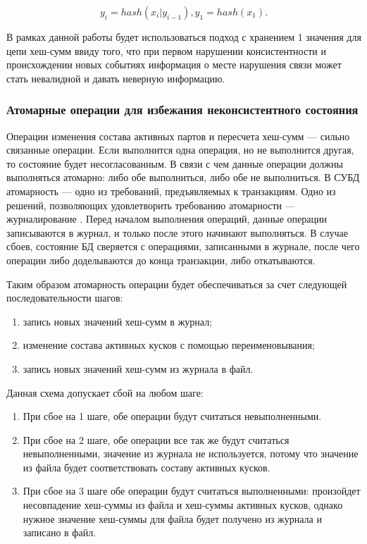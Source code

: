 \begin{equation}
\label{eq:rec}
y_i = hash(x_i|y_{i-1}), y_1 = hash(x_1).
\end{equation}

В рамках данной работы будет использоваться подход с хранением 1 значения для цепи хеш-сумм ввиду того, что при первом нарушении консистентности и происхождении новых событиях информация о месте нарушения связи может стать невалидной и давать неверную информацию.

\subsubsection{Атомарные операции для избежания неконсистентного состояния}

Операции изменения состава активных партов и пересчета хеш-сумм --- сильно связанные операции. Если выполнится одна операция, но не выполнится другая, то состояние будет несогласованным. В связи с чем данные операции должны выполняться атомарно: либо обе выполниться, либо обе не выполниться. В СУБД атомарность \cite{atomicity} --- одно из требований, предъявляемых к транзакциям. Одно из решений, позволяющих удовлетворить требованию атомарности --- журналирование \cite{journaldbms}. Перед началом выполнения операций, данные операции записываются в журнал, и только после этого начинают выполняться. В случае сбоев, состояние БД сверяется с операциями, записанными в журнале, после чего операции либо доделываются до конца транзакции, либо откатываются.

Таким образом атомарность операции будет обеспечиваться за счет следующей последовательности шагов:
\begin{enumerate}
	\item запись новых значений хеш-сумм в журнал;
	\item изменение состава активных кусков с помощью переименовывания;
	\item запись новых значений хеш-сумм из журнала в файл.
\end{enumerate}

Данная схема допускает сбой на любом шаге:
\begin{enumerate}
	\item При сбое на 1 шаге, обе операции будут считаться невыполненными.
	\item При сбое на 2 шаге, обе операции все так же будут считаться невыполненными, значение из журнала не используется, потому что значение из файла будет соответствовать составу активных кусков.
	\item При сбое на 3 шаге обе операции будут считаться выполненными: произойдет несовпадение хеш-суммы из файла и хеш-суммы активных кусков, однако нужное значение хеш-суммы для файла будет получено из журнала и записано в файл.
\end{enumerate}

